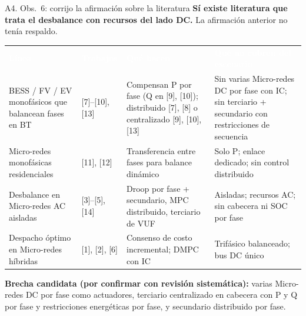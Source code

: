\documentclass[aspectratio=169,10pt,t]{beamer}
\newcommand{\thead}{\rowcolor{usachO}}
\newcommand{\Th}[1]{\textcolor{white}{\textbf{#1}}}
\begin{document}
\begin{frame}{A4. Obs.\ 6: corrijo la afirmación sobre la literatura}
  \scriptsize\renewcommand{\arraystretch}{1.22}
  \textbf{Sí existe literatura que trata el desbalance con recursos del lado DC.} La afirmación anterior no tenía respaldo.\\[4pt]
  \begin{tabularx}{\textwidth}{@{}p{2.7cm}p{1.25cm}X X@{}}
    \thead \Th{Línea} & \Th{Trabajos} & \Th{Qué hacen} & \Th{Qué no cubren del escenario} \\
    BESS / FV / EV monofásicos que balancean fases en BT & [7]--[10], [13] & Compensan P por fase (Q en [9], [10]); distribuido [7], [8] o centralizado [9], [10], [13] & Sin varias Micro-redes DC por fase con IC; sin terciario + secundario con restricciones de secuencia \\
    Micro-redes monofásicas residenciales & [11], [12] & Transferencia entre fases para balance dinámico & Solo P; enlace dedicado; sin control distribuido \\
    Desbalance en Micro-redes AC aisladas & [3]--[5], [14] & Droop por fase + secundario, MPC distribuido, terciario de VUF & Aisladas; recursos AC; sin cabecera ni SOC por fase \\
    Despacho óptimo en Micro-redes híbridas & [1], [2], [6] & Consenso de costo incremental; DMPC con IC & Trifásico balanceado; bus DC único \\
  \end{tabularx}

  \vspace{5pt}
  \footnotesize\textbf{Brecha candidata (por confirmar con revisión sistemática):} varias Micro-redes DC por fase como actuadores, terciario centralizado en cabecera con P y Q por fase y restricciones energéticas por fase, y secundario distribuido por fase.
\end{frame}
\end{document}
